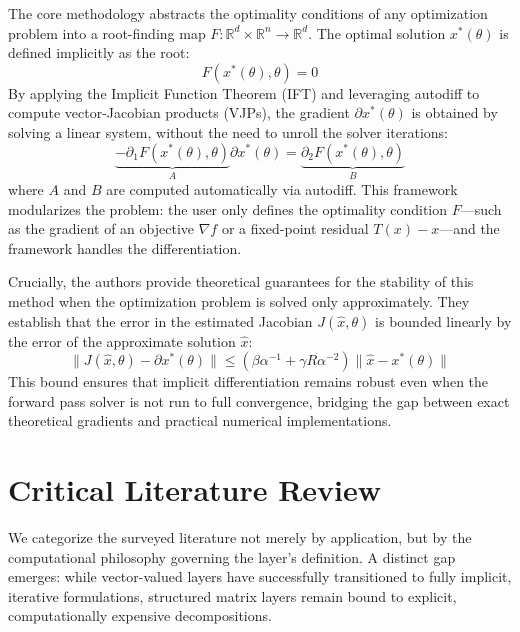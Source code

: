 \documentclass{article}
\begin{document}
The core methodology abstracts the optimality conditions of any optimization problem into a root-finding map $F: \mathbb{R}^d \times \mathbb{R}^n \to \mathbb{R}^d$. The optimal solution $x^*(\theta)$ is defined implicitly as the root:
\begin{equation}
  F(x^*(\theta), \theta) = 0
\end{equation}
By applying the Implicit Function Theorem (IFT) and leveraging autodiff to compute vector-Jacobian products (VJPs), the gradient $\partial x^*(\theta)$ is obtained by solving a linear system, without the need to unroll the solver iterations:
\begin{equation}
  \underbrace{-\partial_1 F(x^*(\theta), \theta)}_{A} \partial x^*(\theta) = \underbrace{\partial_2 F(x^*(\theta), \theta)}_{B}
\end{equation}
where $A$ and $B$ are computed automatically via autodiff. This framework modularizes the problem: the user only defines the optimality condition $F$—such as the gradient of an objective $\nabla f$ or a fixed-point residual $T(x)-x$—and the framework handles the differentiation.

Crucially, the authors provide theoretical guarantees for the stability of this method when the optimization problem is solved only approximately. They establish that the error in the estimated Jacobian $J(\hat{x}, \theta)$ is bounded linearly by the error of the approximate solution $\hat{x}$:
\begin{equation}
  \| J(\hat{x}, \theta) - \partial x^*(\theta) \| \leq \left( \beta \alpha^{-1} + \gamma R \alpha^{-2} \right) \| \hat{x} - x^*(\theta) \|
\end{equation}
This bound ensures that implicit differentiation remains robust even when the forward pass solver is not run to full convergence, bridging the gap between exact theoretical gradients and practical numerical implementations.

\section{Critical Literature Review}
\label{sec:review}

We categorize the surveyed literature not merely by application, but by the computational philosophy governing the layer's definition. A distinct gap emerges: while vector-valued layers have successfully transitioned to fully implicit, iterative formulations, structured matrix layers remain bound to explicit, computationally expensive decompositions.
\end{document}
